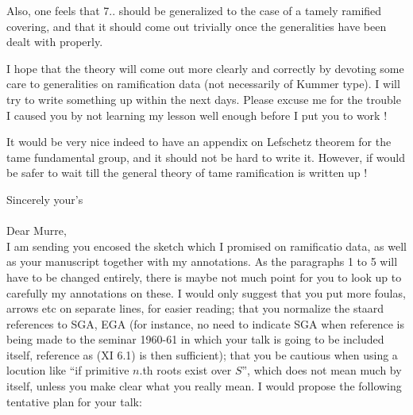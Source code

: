Also, one feels that 7.. should be generalized to the case of a tamely ramified covering, and that it should come out trivially once the generalities have been dealt with properly.

I hope that the theory will come out more clearly and correctly by devoting some care to generalities on ramification data (not necessarily of Kummer type). I will try to write something up within the next days. Please excuse me for the trouble I caused you by not learning my lesson well enough before I put you to work !

It would be very nice indeed to have an appendix on Lefschetz theorem for the tame fundamental group, and it should not be hard to write it. However, if would be safer to wait till the general theory of tame ramification is written up !

Sincerely your's\\

\hfill{}\\

Dear Murre,\\

I am sending you encosed the sketch which I promised on ramificatio
data, as well as your manuscript together with my annotations. As the paragraphs 1 to 5 will have to be changed entirely, there is maybe not much point for you to look up to carefully my annotations on these.  I would only suggest that you put more foulas, arrows etc on  separate lines, for easier reading; that you normalize the staard references to SGA, EGA (for instance, no need to indicate SGA when reference is being made to the seminar 1960-61 in which your talk is going to be included itself, reference as (XI 6.1) is then sufficient); that you be cautious when using a locution like ``if primitive $n$.th roots exist over $S$'', which does not mean much by itself, unless you make clear what you really mean. I would propose the following tentative plan for your talk:


